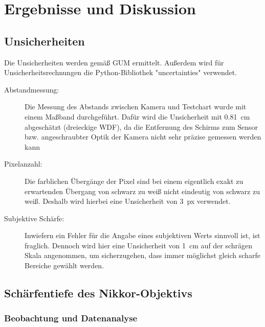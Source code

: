 \documentclass[
	a4paper,
	12pt,
	pagesize,
	ngerman
]{scrartcl}
\begin{document}
	\section{Ergebnisse und Diskussion}
	
	\subsection{Unsicherheiten} %
Die Unsicherheiten werden gemäß GUM ermittelt. 
	Außerdem wird für Unsicherheitsrechnungen die Python-Bibliothek "uncertainties" verwendet.
	\begin{description}
		\item[Abstandmessung:] Die Messung des Abstands zwischen Kamera und Testchart wurde mit einem Maßband durchgeführt. 
			Dafür wird die Unsicherheit mit \SI{0,81}{cm} abgeschätzt (dreieckige WDF), da die Entfernung des Schirms zum Sensor bzw. angeschraubter Optik der Kamera nicht sehr präzise gemessen werden kann
		\item[Pixelanzahl:] Die farblichen Übergänge der Pixel sind bei einem eigentlich exakt zu erwartenden Übergang von schwarz zu weiß nicht eindeutig von schwarz zu weiß. %
			Deshalb wird hierbei eine Unsicherheit von \SI{3}{px} verwendet.
		\item[Subjektive Schärfe:] Inwiefern ein Fehler für die Angabe eines subjektiven Werts sinnvoll ist, ist fraglich. %
			Dennoch wird hier eine Unsicherheit von \SI{1}{cm} auf der schrägen Skala angenommen, um sicherzugehen, dass immer möglichst gleich scharfe Bereiche gewählt werden. 
	\end{description} %

	\subsection{Schärfentiefe des Nikkor-Objektivs}
	\subsubsection{Beobachtung und Datenanalyse}
\end{document}
